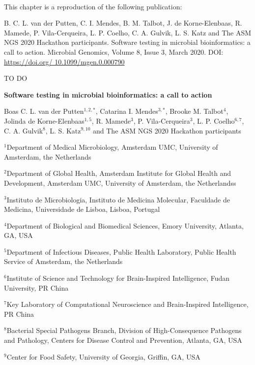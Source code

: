 \mbox{}\\
\vspace{8cm}

This chapter is a reproduction of the following publication:

B. C. L. van der Putten, C. I. Mendes, B. M. Talbot, J. de Korne-Elenbaas, R. Mamede, P. Vila-Cerqueira, L. P. Coelho, C. A. Gulvik, L. S. Katz and The ASM NGS 2020 Hackathon participants. Software testing in microbial bioinformatics: a call to action. Microbial Genomics, Volume 8, Issue 3, March 2020. DOI: \url{https://doi.org/ 10.1099/mgen.0.000790}

TO DO 

\cleardoublepage 

\begin{center}
\large
\textbf{Software testing in microbial bioinformatics: a call to action}
\end{center}

Boas C. L. van der Putten$^{1,2,*}$, 
Catarina I. Mendes$^{3,*}$,
Brooke M. Talbot$^{4}$, 
Jolinda de Korne-Elenbaas$^{1,5}$, 
R. Mamede$^{3}$, 
P. Vila-Cerqueira$^{3}$, 
L. P. Coelho$^{6,7}$, 
C. A. Gulvik$^{8}$, 
L. S. Katz$^{9,10}$ and The ASM NGS 2020 Hackathon participants

$^1$Department of Medical Microbiology, Amsterdam UMC, University of Amsterdam, the Netherlands

$^2$Department of Global Health, Amsterdam Institute for Global Health and Development, Amsterdam UMC, University of Amsterdam, the Netherlandss

$^3$Instituto de Microbiologia, Instituto de Medicina Molecular, Faculdade de Medicina, Universidade de Lisboa, Lisboa, Portugal 

$^4$Department of Biological and Biomedical Sciences, Emory University, Atlanta, GA, USA

$^5$Department of Infectious Diseases, Public Health Laboratory, Public Health Service of Amsterdam, the Netherlands

$^6$Institute of Science and Technology for Brain-Inspired Intelligence, Fudan University, PR China

$^7$Key Laboratory of Computational Neuroscience and Brain-Inspired Intelligence, PR China

$^8$Bacterial Special Pathogens Branch, Division of High-Consequence Pathogens and Pathology, Centers for Disease Control and Prevention, Atlanta, GA, USA

$^9$Center for Food Safety, University of Georgia, Griffin, GA, USA

